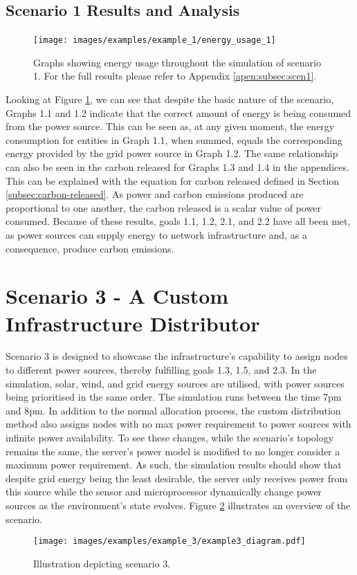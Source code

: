 \documentclass{l4proj}
\begin{document}
\subsection{Scenario 1 Results and Analysis}
\begin{figure}[h]
    \centering
    \texttt{[image: images/examples/example\_1/energy\_usage\_1]}
    ~
    \caption{Graphs showing energy usage throughout the simulation of scenario 1. For the full results please refer to Appendix \ref{apen:subsec:scen1}.}
    \label{fig:example1_results_energy}
\end{figure}
Looking at Figure \ref{fig:example1_results_energy}, we can see that despite the basic nature of the scenario, Graphs 1.1 and 1.2 indicate that the correct amount of energy is being consumed from the power source.
This can be seen as, at any given moment, the energy consumption for entities in Graph 1.1, when summed, equals the corresponding energy provided by the grid power source in Graph 1.2.
The same relationship can also be seen in the carbon released for Graphs 1.3 and 1.4 in the appendices.
This can be explained with the equation for carbon released defined in Section \ref{subsec:carbon-released}.
As power and carbon emissions produced are proportional to one another, the carbon released is a scalar value of power consumed.
Because of these results, goals 1.1, 1.2, 2.1, and 2.2 have all been met, as power sources can supply energy to network infrastructure and, as a consequence, produce carbon emissions.

\section{Scenario 3 - A Custom Infrastructure Distributor}\label{eval:subsec:scenario3}
Scenario 3 is designed to showcase the infrastructure's capability to assign nodes to different power sources, thereby fulfilling goals 1.3, 1.5, and 2.3.
In the simulation, solar, wind, and grid energy sources are utilised, with power sources being prioritised in the same order.
The simulation runs between the time 7pm and 8pm.
In addition to the normal allocation process, the custom distribution method also assigns nodes with no max power requirement to power sources with infinite power availability.
To see these changes, while the scenario's topology remains the same, the server's power model is modified to no longer consider a maximum power requirement.
As such, the simulation results should show that despite grid energy being the least desirable, the server only receives power from this source while the sensor and microprocessor dynamically change power sources as the environment's state evolves.
Figure \ref{fig:example3_diagram} illustrates an overview of the scenario.
\begin{figure}[h]
    \centering
    \texttt{[image: images/examples/example\_3/example3\_diagram.pdf]}
    \caption{Illustration depicting scenario 3.}
    \label{fig:example3_diagram}
\end{figure}
\end{document}
